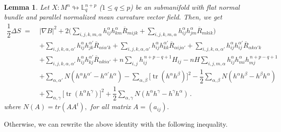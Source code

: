 \documentclass[leqno,11pt]{amsart}
\theoremstyle{plain}
\newtheorem{lemma}[theorem]{\indent\sc Lemma}
\theoremstyle{definition}
\numberwithin{equation}{section}
\begin{document}
\begin{lemma}\label{formula simons}
Let $X:M^{n}\looparrowright \mathbb{L}^{n+p}_{q}$ ($1\leq q\leq p$) be an submanifold with flat normal bundle and parallel normalized mean curvature vector field. Then, we get
\begin{equation}\label{simons_identity}
\begin{aligned}
\dfrac{1}{2}\Delta S \;=\;& |\nabla B|^2
  + 2\Bigg(
      \sum_{i,j,k,m,\alpha} h_{ij}^{\alpha}h_{km}^{\alpha}\overline{R}_{mijk}
      + \sum_{i,j,k,m,\alpha} h_{ij}^{\alpha}h_{jm}^{\alpha}\overline{R}_{mkik}
    \Bigg) \\[6pt]
&+ \sum_{i,j,k,\alpha,\alpha'} h_{ij}^{\alpha}h_{jk}^{\alpha'}\overline{R}_{\alpha i \alpha' k}
  + \sum_{i,j,k,\alpha,\alpha'} h_{ij}^{\alpha}h_{kk}^{\alpha'}\overline{R}_{\alpha ij \alpha'}
  + \sum_{i,j,k,\alpha,\alpha'} h_{ij}^{\alpha}h_{ij}^{\alpha'}\overline{R}_{\alpha k \alpha' k} \\[6pt]
&+ \sum_{i,j,k,\alpha,\alpha'} h_{ij}^{\alpha}h_{kj}^{\alpha'}\overline{R}_{\alpha ki \alpha'}
  + n\sum_{i,j} h_{ij}^{\,n+p-q+1}H_{ij}
  - nH\sum_{i,j,m,\alpha} h_{ij}^{\alpha}h_{mi}^{\alpha}h_{mj}^{\,n+p-q+1} \\[6pt]
&+ \sum_{\alpha,\alpha'} N(h^{\alpha}h^{\alpha'}-h^{\alpha'}h^{\alpha})
  - \sum_{\alpha,\beta} \big[\operatorname{tr}(h^{\alpha}h^{\beta})\big]^2
  - \dfrac{1}{2}\sum_{\alpha,\beta} N(h^{\alpha}h^{\beta}-h^{\beta}h^{\alpha}) \\[6pt]
&+ \sum_{\alpha,\gamma} \big[\operatorname{tr}(h^{\alpha}h^{\gamma})\big]^2
  + \dfrac{1}{2}\sum_{\alpha,\gamma} N(h^{\alpha}h^{\gamma}-h^{\gamma}h^{\alpha}) \,.
\end{aligned}
\end{equation}
where $N(A)=tr(AA^{t}),$ for all matrix $A=(a_{ij}).$
\end{lemma}

Otherwise, we can rewrite the above identity with the following inequality.
\end{document}
